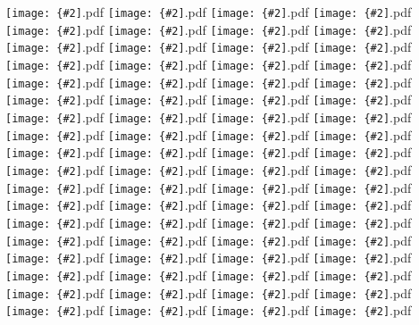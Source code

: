 \documentclass[12pt,a4paper]{article}
\newcommand{\pdffig}[2][0.5]{\texttt{[image: \{\#2]}.pdf}}
\begin{document}
\noindent\pdffig[0.5]{Lin_Regression_Aus_tsfc_dlwr}
\pdffig[0.5]{Lin_Regression_Aus_tsfc_dswr}
\pdffig[0.5]{Lin_Regression_Aus_tsfc_lhf}
\pdffig[0.5]{Lin_Regression_Aus_tsfc_precip}
\pdffig[0.5]{Lin_Regression_Aus_tsfc_rhum}
\pdffig[0.5]{Lin_Regression_Aus_tsfc_sfc_temp}
\pdffig[0.5]{Lin_Regression_Aus_tsfc_shf}
\pdffig[0.5]{Lin_Regression_Aus_tsfc_smc}
\pdffig[0.5]{Lin_Regression_India_tsfc_dlwr}
\pdffig[0.5]{Lin_Regression_India_tsfc_dswr}
\pdffig[0.5]{Lin_Regression_India_tsfc_lhf}
\pdffig[0.5]{Lin_Regression_India_tsfc_precip}
\pdffig[0.5]{Lin_Regression_India_tsfc_rhum}
\pdffig[0.5]{Lin_Regression_India_tsfc_sfc_temp}
\pdffig[0.5]{Lin_Regression_India_tsfc_shf}
\pdffig[0.5]{Lin_Regression_India_tsfc_smc}
\pdffig[0.5]{Lin_Regression_MC_tsfc_dlwr}
\pdffig[0.5]{Lin_Regression_MC_tsfc_dswr}
\pdffig[0.5]{Lin_Regression_MC_tsfc_lhf}
\pdffig[0.5]{Lin_Regression_MC_tsfc_precip}
\pdffig[0.5]{Lin_Regression_MC_tsfc_rhum}
\pdffig[0.5]{Lin_Regression_MC_tsfc_sfc_temp}
\pdffig[0.5]{Lin_Regression_MC_tsfc_shf}
\pdffig[0.5]{Lin_Regression_MC_tsfc_smc}
\pdffig[0.5]{Lin_Regression_NthEastAfr_tsfc_dlwr}
\pdffig[0.5]{Lin_Regression_NthEastAfr_tsfc_dswr}
\pdffig[0.5]{Lin_Regression_NthEastAfr_tsfc_lhf}
\pdffig[0.5]{Lin_Regression_NthEastAfr_tsfc_precip}
\pdffig[0.5]{Lin_Regression_NthEastAfr_tsfc_rhum}
\pdffig[0.5]{Lin_Regression_NthEastAfr_tsfc_sfc_temp}
\pdffig[0.5]{Lin_Regression_NthEastAfr_tsfc_shf}
\pdffig[0.5]{Lin_Regression_NthEastAfr_tsfc_smc}
\pdffig[0.5]{Lin_Regression_NthWestAfr_tsfc_dlwr}
\pdffig[0.5]{Lin_Regression_NthWestAfr_tsfc_dswr}
\pdffig[0.5]{Lin_Regression_NthWestAfr_tsfc_lhf}
\pdffig[0.5]{Lin_Regression_NthWestAfr_tsfc_precip}
\pdffig[0.5]{Lin_Regression_NthWestAfr_tsfc_rhum}
\pdffig[0.5]{Lin_Regression_NthWestAfr_tsfc_sfc_temp}
\pdffig[0.5]{Lin_Regression_NthWestAfr_tsfc_shf}
\pdffig[0.5]{Lin_Regression_NthWestAfr_tsfc_smc}
\pdffig[0.5]{Lin_Regression_SthAfr_tsfc_dlwr}
\pdffig[0.5]{Lin_Regression_SthAfr_tsfc_dswr}
\pdffig[0.5]{Lin_Regression_SthAfr_tsfc_lhf}
\pdffig[0.5]{Lin_Regression_SthAfr_tsfc_precip}
\pdffig[0.5]{Lin_Regression_SthAfr_tsfc_rhum}
\pdffig[0.5]{Lin_Regression_SthAfr_tsfc_sfc_temp}
\pdffig[0.5]{Lin_Regression_SthAfr_tsfc_shf}
\pdffig[0.5]{Lin_Regression_SthAfr_tsfc_smc}
\pdffig[0.5]{Lin_Regression_SthSthAm_tsfc_dlwr}
\pdffig[0.5]{Lin_Regression_SthSthAm_tsfc_dswr}
\pdffig[0.5]{Lin_Regression_SthSthAm_tsfc_lhf}
\pdffig[0.5]{Lin_Regression_SthSthAm_tsfc_precip}
\pdffig[0.5]{Lin_Regression_SthSthAm_tsfc_rhum}
\pdffig[0.5]{Lin_Regression_SthSthAm_tsfc_sfc_temp}
\pdffig[0.5]{Lin_Regression_SthSthAm_tsfc_shf}
\pdffig[0.5]{Lin_Regression_SthSthAm_tsfc_smc}
\pdffig[0.5]{Lin_Regression_TropAfr_tsfc_dlwr}
\pdffig[0.5]{Lin_Regression_TropAfr_tsfc_dswr}
\pdffig[0.5]{Lin_Regression_TropAfr_tsfc_lhf}
\pdffig[0.5]{Lin_Regression_TropAfr_tsfc_precip}
\pdffig[0.5]{Lin_Regression_TropAfr_tsfc_rhum}
\pdffig[0.5]{Lin_Regression_TropAfr_tsfc_sfc_temp}
\pdffig[0.5]{Lin_Regression_TropAfr_tsfc_shf}
\pdffig[0.5]{Lin_Regression_TropAfr_tsfc_smc}
\pdffig[0.5]{Lin_Regression_TropSthAm_tsfc_dlwr}
\pdffig[0.5]{Lin_Regression_TropSthAm_tsfc_dswr}
\pdffig[0.5]{Lin_Regression_TropSthAm_tsfc_lhf}
\pdffig[0.5]{Lin_Regression_TropSthAm_tsfc_precip}
\pdffig[0.5]{Lin_Regression_TropSthAm_tsfc_rhum}
\pdffig[0.5]{Lin_Regression_TropSthAm_tsfc_sfc_temp}
\pdffig[0.5]{Lin_Regression_TropSthAm_tsfc_shf}
\pdffig[0.5]{Lin_Regression_TropSthAm_tsfc_smc}
\end{document}
